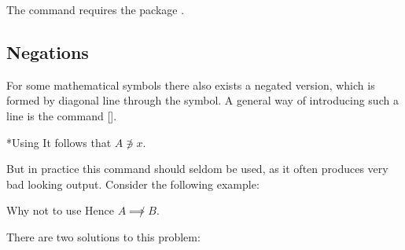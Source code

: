 The command  requires the package .



\subsection{Negations}

For some mathematical symbols there also exists a negated version, which is formed by diagonal line through the symbol.
A general way of introducing such a line is the command [\comname].
\begin{showlatex}*{Using }
  It follows that $A \not\ni x$.
\end{showlatex}
But in practice this command should seldom be used, as it often produces very bad looking output.
Consider the following example:
\begin{showlatex}{Why not to use }
  Hence $A \not\implies B$.
\end{showlatex}
There are two solutions to this problem:

